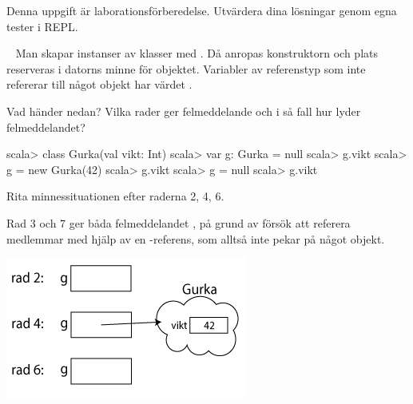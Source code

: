 \SOLUTION


\TaskSolved \what Denna uppgift är laborationsförberedelse. Utvärdera dina lösningar genom egna tester i REPL.

\QUESTEND






\ExtraTasks %



\QUESTBEGIN

\Task  \what~  Man skapar instanser av klasser med . Då anropas konstruktorn och plats reserveras i datorns minne för objektet. Variabler av referenstyp som inte refererar till något objekt har värdet .

\Subtask Vad händer nedan? Vilka rader ger felmeddelande och i så fall hur lyder felmeddelandet?

\begin{REPL}
scala> class Gurka(val vikt: Int)
scala> var g: Gurka = null
scala> g.vikt
scala> g = new Gurka(42)
scala> g.vikt
scala> g = null
scala> g.vikt
\end{REPL}

\Subtask Rita minnessituationen efter raderna 2, 4, 6.

\SOLUTION


\TaskSolved \what


\SubtaskSolved  Rad 3 och 7 ger båda felmeddelandet ,  på grund av försök att referera medlemmar med hjälp av en -referens, som alltså inte pekar på något objekt.

\SubtaskSolved  \includegraphics[scale=0.6]{../img/w06-solutions/1b}


\QUESTEND




